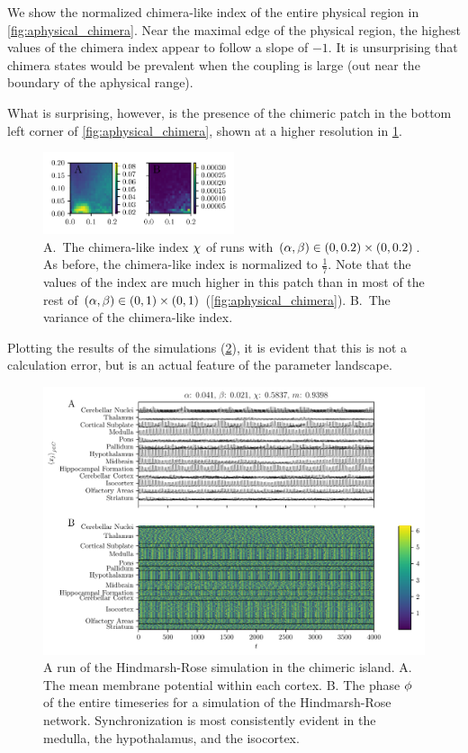 We show the normalized chimera-like index of the entire physical region in \cref{fig:aphysical_chimera}.
Near the maximal edge of the physical region, the highest values of the chimera index appear to follow a slope of $-1$.
It is unsurprising that chimera states would be prevalent when the coupling is large (out near the boundary of the aphysical range).

What is surprising, however, is the presence of the chimeric patch in the bottom left corner of \cref{fig:aphysical_chimera}, shown at a higher resolution in \cref{fig:zoom}.
\begin{figure}[ht]
  \centering
  \includegraphics[width=0.5\textwidth]{figure/zoom_100dpi.pdf}
  \caption[Zoomed landscape]{A.\ The chimera-like index $\chi$ of runs with $(\alpha, \beta) \in (0, 0.2) \times (0, 0.2)$.
    As before, the chimera-like index is normalized to $\frac{1}{7}$.
    Note that the values of the index are much higher in this patch than in most of the rest of $(\alpha, \beta) \in (0, 1) \times (0, 1)$ (\cref{fig:aphysical_chimera}).
    B.\ The variance of the chimera-like index.
  }
  \label{fig:zoom}
\end{figure}
Plotting the results of the simulations (\cref{fig:041_021}),
it is evident that this is not a calculation error, but is an actual feature of the parameter landscape.
\begin{figure}[ht]
  \centering
  \includegraphics[width=\textwidth]{figure/0_041-0_021_200dpi.pdf}
  \caption[Highly chimeric simulation]{A run of the Hindmarsh-Rose simulation in the chimeric island.
    A. The mean membrane potential within each cortex.
    B. The phase $\phi$ of the entire timeseries for a simulation of the Hindmarsh-Rose network.
    Synchronization is most consistently evident in the medulla, the hypothalamus, and the isocortex.
  }
  \label{fig:041_021}
\end{figure}

